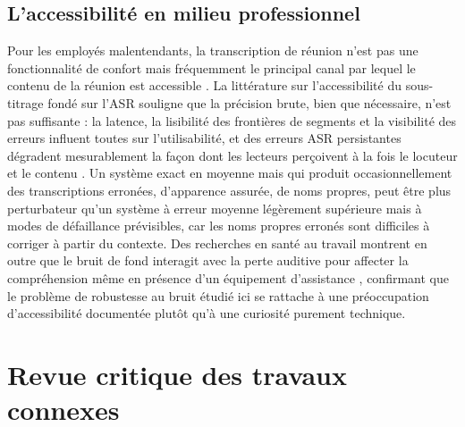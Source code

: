 \documentclass[12pt]{report}
\begin{document}
\subsection{L'accessibilité en milieu professionnel}
Pour les employés malentendants, la transcription de réunion n'est pas une fonctionnalité de confort mais fréquemment le principal canal par lequel le contenu de la réunion est accessible \cite{marsja2025digital}. La littérature sur l'accessibilité du sous-titrage fondé sur l'ASR souligne que la précision brute, bien que nécessaire, n'est pas suffisante : la latence, la lisibilité des frontières de segments et la visibilité des erreurs influent toutes sur l'utilisabilité, et des erreurs ASR persistantes dégradent mesurablement la façon dont les lecteurs perçoivent à la fois le locuteur et le contenu \cite{kadoma2026lost}. Un système exact en moyenne mais qui produit occasionnellement des transcriptions erronées, d'apparence assurée, de noms propres, peut être plus perturbateur qu'un système à erreur moyenne légèrement supérieure mais à modes de défaillance prévisibles, car les noms propres erronés sont difficiles à corriger à partir du contexte. Des recherches en santé au travail montrent en outre que le bruit de fond interagit avec la perte auditive pour affecter la compréhension même en présence d'un équipement d'assistance \cite{giguere2010modelling,gygi2016background}, confirmant que le problème de robustesse au bruit étudié ici se rattache à une préoccupation d'accessibilité documentée plutôt qu'à une curiosité purement technique.
\section{Revue critique des travaux connexes}
\end{document}
